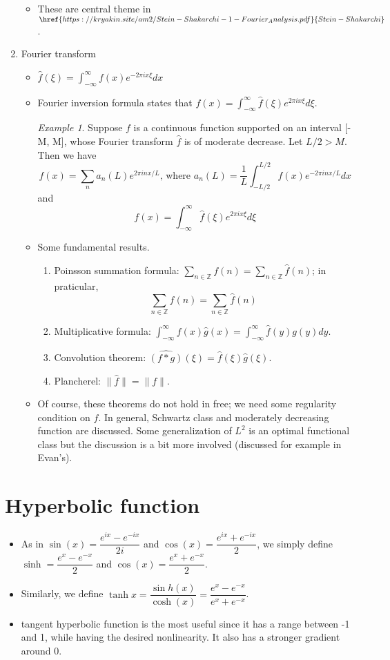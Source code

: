 \documentclass[11pt,reqno]{amsart}
\theoremstyle{remark}
\newtheorem{example}{Example}
\begin{document}
\begin{sloppypar}
\begin{enumerate}
\begin{itemize}
\item These are central theme in $\href{https://kryakin.site/am2/Stein-Shakarchi-1-Fourier_Analysis.pdf}{Stein-Shakarchi}$.
\end{itemize}
\item Fourier transform
\begin{itemize}
\item $\hat f(\xi)=\int^\infty_{-\infty}f(x)e^{-2\pi ix\xi}dx$
\item Fourier inversion formula states that $f(x)=\int^\infty_{-\infty}\hat f(\xi)e^{2\pi ix\xi}d\xi$.
\begin{example}
Suppose $f$ is a continuous function supported on an interval [-M, M], whose Fourier transform $\hat f$ is of moderate decrease. Let $L/2>M$. Then we have 
\[
f(x)=\sum_n a_n(L)e^{2\pi inx/L}\text{, where } a_n(L)=\frac 1L\int^{L/2}_{-L/2}f(x)e^{-2\pi inx/L}dx
\]
and
\[
f(x)=\int^{\infty}_{-\infty}\hat f(\xi)e^{2\pi ix\xi}d\xi
\]
\end{example}
\item Some fundamental results.
\begin{enumerate}
\item Poinsson summation formula: $\sum_{n\in\mathbb{Z}}f(n)=\sum_{n\in\mathbb{Z}}\hat f(n)$; in praticular, 
\[
\sum_{n\in\mathbb{Z}}f(n)=\sum_{n\in\mathbb{Z}}\hat f(n)
\]
\item Multiplicative formula: $\int^\infty_{-\infty}f(x)\hat g(x)=\int^\infty_{-\infty}\hat f(y)g(y)dy$.
\item Convolution theorem: $\widehat{(f * g)}(\xi)=\hat f(\xi)\hat g(\xi)$.
\item Plancherel: $\lVert \hat f\rVert=\lVert f\rVert$.
\end{enumerate}
\item Of course, these theorems do not hold in free; we need some regularity condition on $f$. In general, Schwartz class and moderately decreasing function 
are discussed. Some generalization of $L^2$ is an optimal functional class but the discussion is a bit more involved (discussed for example in Evan's). 
\end{itemize}
\end{enumerate}

\section*{Hyperbolic function}
\begin{itemize}
\item As in $\sin(x)=\dfrac{e^{ix}-e^{-ix}}{2i}$ and $\cos(x)=\dfrac{e^{ix}+e^{-ix}}2$, we simply
 define $\sinh=\dfrac{e^{x}-e^{-x}}{2}$ and $\cos(x)=\dfrac{e^{x}+e^{-x}}2$.
\item Similarly, we define $\tanh x = \dfrac{\sin h(x)}{\cosh (x)}=\dfrac{e^x-e^{-x}}{e^x+e^{-x}}$.
\item tangent hyperbolic function is the most useful since it has a range between -1 and 1, 
while having the desired nonlinearity. It also has a stronger gradient around 0.
\end{itemize}


\end{sloppypar}
\end{document}
